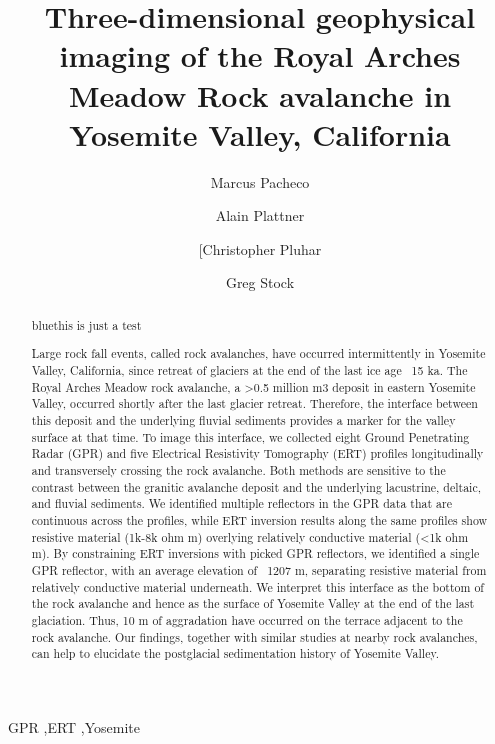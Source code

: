 \documentclass[5p]{elsarticle}
\newcommand{\COMON}{\begin{color}{blue}}
\newcommand{\COMOFF}{\end{color}}
\begin{document}
	\begin{frontmatter}

\title{Three-dimensional geophysical imaging of the Royal Arches Meadow Rock avalanche in Yosemite Valley, California}

\author[Marcus]{Marcus Pacheco}
\address[Marcus]{California State University, Fresno}

\author[Alain]{Alain Plattner}
\address[Alain]{University of Alabama}

\author[Chris]{[Christopher Pluhar}
\address[Chris]{California State University, Fresno}

\author[Greg]{Greg Stock}
\address[Greg]{Yosemite National Park}



										\begin{abstract}
										
\COMON this is just a test \COMOFF Large rock fall events, called rock avalanches, have occurred intermittently in Yosemite Valley, California, since retreat of glaciers at the end of the last ice age ~15 ka. The Royal Arches Meadow rock avalanche, a >0.5 million m3 deposit in eastern Yosemite Valley, occurred shortly after the last glacier retreat. Therefore, the interface between this deposit and the underlying fluvial sediments provides a marker for the valley surface at that time. To image this interface, we collected eight Ground Penetrating Radar (GPR) and five Electrical Resistivity Tomography (ERT) profiles longitudinally and transversely crossing the rock avalanche. Both methods are sensitive to the contrast between the granitic avalanche deposit and the underlying lacustrine, deltaic, and fluvial sediments. We identified multiple reflectors in the GPR data that are continuous across the profiles, while ERT inversion results along the same profiles show resistive material (1k-8k ohm m) overlying relatively conductive material (<1k ohm m). By constraining ERT inversions with picked GPR reflectors, we identified a single GPR reflector, with an average elevation of ~1207 m, separating resistive material from relatively conductive material underneath. We interpret this interface as the bottom of the rock avalanche and hence as the surface of Yosemite Valley at the end of the last glaciation. Thus, 10 m of aggradation have occurred on the terrace adjacent to the rock avalanche. Our findings, together with similar studies at nearby rock avalanches, can help to elucidate the postglacial sedimentation history of Yosemite Valley. 

									\end{abstract}

					\begin{keyword}
GPR \sep ERT \sep Yosemite
					\end{keyword}

	\end{frontmatter}
\end{document}
